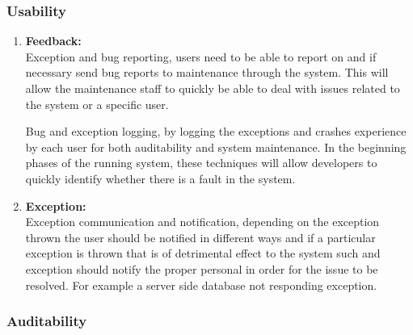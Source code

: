 \documentclass{article}
\begin{document}
		\subsubsection{Usability}

			\begin{enumerate}

				\item{\bfseries Feedback:}\\

				Exception and bug reporting, users need to be able to report on and if necessary send bug reports to maintenance through the system. This will allow the maintenance staff to quickly be able to deal with issues related to the system or a specific user.

				Bug and exception logging, by logging the exceptions and crashes experience by each user for both auditability and system maintenance. In the beginning phases of the running system, these techniques will allow developers to quickly identify whether there is a fault in the system.

				\item{\bfseries Exception:}\\

				Exception communication and notification, depending on the exception thrown the user should be notified in different ways and if a particular exception is thrown that is of detrimental effect to the system such and exception should notify the proper personal in order for the issue to be resolved. For example a server side database not responding exception.

			\end{enumerate}

		\subsubsection{Auditability}
\end{document}

